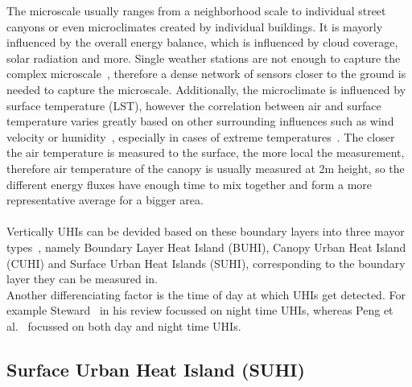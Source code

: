 The microscale usually ranges from a neighborhood scale to individual street canyons or even microclimates created by individual buildings. It is mayorly influenced by the overall energy balance, which is influenced by cloud coverage, solar radiation and more. Single weather stations are not enough to capture the complex microscale~\cite{oke2004siting}, therefore a dense network of sensors closer to the ground is needed to capture the microscale. Additionally, the microclimate is influenced by surface temperature (LST), however the correlation between air and surface temperature varies greatly based on other surrounding influences such as wind velocity or humidity~\cite{stoll1992surface}, especially in cases of extreme temperatures~\cite{good2016situ}. The closer the air temperature is measured to the surface, the more local the measurement, therefore air temperature of the canopy is usually measured at 2m height, so the different energy fluxes have enough time to mix together and form a more representative average for a bigger area.\\
\\
Vertically UHIs can be devided based on these boundary layers into three mayor types~\cite{oke1976distinction, oke2017urban}, namely Boundary Layer Heat Island (BUHI), Canopy Urban Heat Island (CUHI) and Surface Urban Heat Islands (SUHI), corresponding to the boundary layer they can be measured in.\\
Another differenciating factor is the time of day at which UHIs get detected. For example Steward~\cite{stewart2011systematic} in his review focussed on night time UHIs, whereas Peng et al.~\cite{peng2012surface} focussed on both day and night time UHIs.

\subsection{Surface Urban Heat Island (SUHI)}

